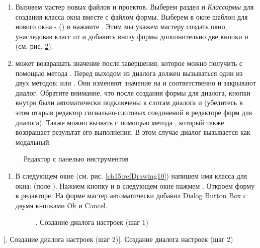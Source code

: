 \begin{enumerate}
\item Вызовем мастер новых файлов и проектов. Выберем раздел \Sys{)} и
\Sys{(}\emph{Клас}\emph{с}\emph{ормы
} для создания класса окна вместе с файлом формы. Выберем в окне
 шаблон для нового окна -
 () и нажмите
. Этим мы укажем мастеру создать окно, унаследовав класс от  и
добавить внизу формы дополнительно две кнопки  и  (см. рис.
\ref{ch15:refDrawing9}). 
\item {} может возвращать значение после завершения, которое можно получить с помощью метода
 . Перед выходом из диалога должен вызываться один из двух методов:
 или . Они изменяют значение
 на  и 
соответственно и закрывают диалог. Обратите внимание, что после создания формы для диалога, кнопки внутри
 были автоматически подключены к слотам диалога  и
 (убедитесь в этом открыв редактор сигнально-слотовых соединений в редакторе форм для диалога).
Также  можно вызвать с помощью метода , который также
возвращает результат его выполнения. В этом случае диалог вызывается как модальный. 
\end{enumerate}
{\centering \par}

\begin{figure}[htb]
\caption[Редактор с панелью инструментов]{Редактор с панелью инструментов}
\label{ch15:refDrawing8}

\end{figure}
\begin{enumerate}
\item В следующем окне (см. рис. \ref{ch15:refDrawing10}) напишем имя класса для окна: 
(поле ). Нажмем кнопку  и в следующем окне нажмем
. Откроем форму в редакторе. На форме мастер автоматически добавил Diаlog Button Box с
двумя кнопками Ok и Cancel.
\begin{figure}[htb]
\caption[. Создание диалога настроек (шаг 1)]{. Создание диалога настроек (шаг 1)}
\label{ch15:refDrawing9}

\end{figure}
\end{enumerate}
{%
[. Создание диалога настроек (шаг 2)]{. Создание диалога настроек (шаг 2)}
\label{ch15:refDrawing10}
\par}


